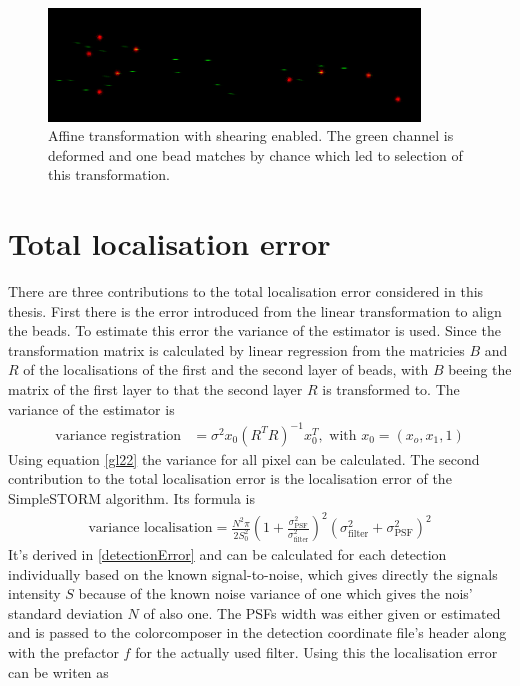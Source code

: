 \begin{figure}
\centering
\includegraphics[width = 0.88\textwidth]{pictures/shearingBad.png}
\caption{Affine transformation with shearing enabled. The green channel is deformed and one bead matches by chance which led to selection of this transformation.}
\label{badshearing}
\end{figure}

\section{Total localisation error}
There are three contributions to the total localisation error considered in this thesis.\newline
First there is the error introduced from the linear transformation to align the beads. To estimate this error the variance of the estimator is used. Since the transformation matrix is calculated by linear regression from the matricies $B$ and $R$ of the localisations of the first and the second layer of beads, with $B$ beeing the matrix of the first layer to that the second layer $R$ is transformed to. The variance of the estimator is
\begin{align}
\text{variance registration}&= \sigma^2 x_0\left(R^TR\right)^{-1}x_0^T, \text{ with }x_0 = \left(x_o,x_1,1\right) \label{gl22}
\end{align}
Using equation \ref{gl22} the variance for all pixel can be calculated.\newline
The second contribution to the total localisation error is the localisation error of the SimpleSTORM algorithm. Its formula is
\begin{align}
 \text{variance localisation} = \frac{N^2\pi}{2S_0^2} \left(1+\frac{\sigma_\text{PSF}^2}{\sigma_\text{filter}^2}\right)^2\left(\sigma_\text{filter}^2+\sigma_\text{PSF}^2\right)^2
\end{align}
It's derived in \ref{detectionError} and can be calculated for each detection individually based on the known signal-to-noise, which gives directly the signals intensity $S$ because of the known noise variance of one which gives the nois' standard deviation $N$ of also one. The PSFs width was either given or estimated and is passed to the colorcomposer in the detection coordinate file's header along with the prefactor $f$ for the actually used filter. Using this the localisation error can be writen as
